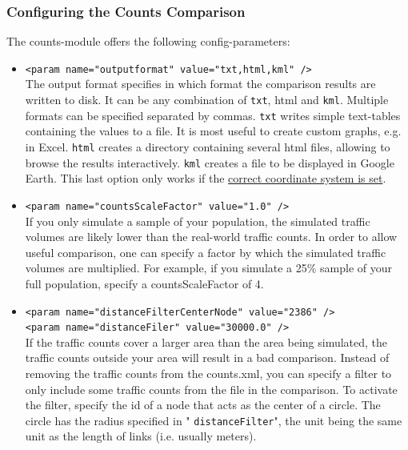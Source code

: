 \subsubsection{Configuring the Counts Comparison}

The counts-module offers the following config-parameters:
\begin{itemize}
	\item 
\texttt{<param name="outputformat" value="txt,html,kml" />}
\\     The output format specifies in which format the comparison results are written to disk. It can be any combination of 
\texttt{txt}, html and 
\texttt{kml}. Multiple formats can be specified separated by commas. 
\texttt{txt} writes simple text-tables containing the values to a file. It is most useful to create custom graphs, e.g. in Excel. 
\texttt{html} creates a directory containing several html files, allowing to browse the results interactively. 
\texttt{kml} creates a file to be displayed in Google Earth. This last option only works if the \href{http://www.matsim.org/node/405}{correct coordinate system is set}.
	\item 
\texttt{<param name="countsScaleFactor" value="1.0" />}
\\     If you only simulate a sample of your population, the simulated  traffic volumes are likely lower than the real-world traffic counts. In  order to allow useful comparison, one can specify a factor by which the  simulated traffic volumes are multiplied. For example, if you simulate a  25\% sample of your full population, specify a countsScaleFactor  of 4.
	\item 
\texttt{<param name="distanceFilterCenterNode" value="2386" />
\\     <param name="distanceFiler" value="30000.0" />}
\\     If the traffic counts cover a larger area than the area being  simulated, the traffic counts outside your area will result in a bad  comparison. Instead of removing the traffic counts from the counts.xml,  you can specify a filter to only include some traffic counts from the  file in the comparison. To activate the filter, specify the id of a node  that acts as the center of a circle. The circle has the radius  specified in "
\texttt{distanceFilter}", the unit being the same unit as the length of links (i.e. usually meters).
\end{itemize}



\vfill\eject
